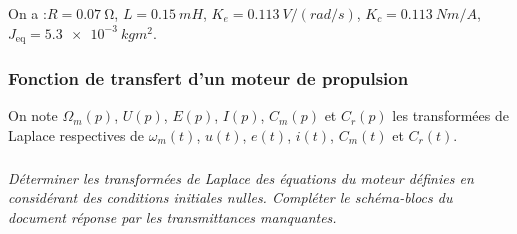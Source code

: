 \begin{multicols}{2}
\begin{multicols}{2}
On a :$R=\SI{0,07}{\ohm}$, $L=\SI{0,15}{mH}$, $K_e=\SI{0,113}{V/(rad/s)}$, 
$K_c=\SI{0,113}{Nm/A}$, $J_{\text{eq}}=\SI{5,3e-3}{kg m^2}$.


\subsubsection*{Fonction de transfert d’un moteur de propulsion}

On note $\Omega_m(p)$, $U(p)$, $E(p)$, $I(p)$, $C_m(p)$ et $C_r(p)$ les transformées de Laplace respectives de $\omega_m(t)$, $u(t)$, $e(t)$, $i(t)$, $C_m(t)$ et $C_r(t)$.


\subparagraph{}
\textit{Déterminer les transformées de Laplace des équations du moteur définies
en considérant des conditions initiales nulles. Compléter le schéma-blocs du document
réponse par les transmittances manquantes.}
\ifprof
\begin{corrige}
\end{corrige}
\else
\fi



\end{multicols}
\end{multicols}
